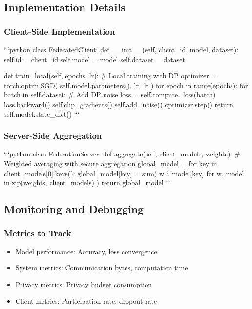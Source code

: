 \documentclass[journal]{IEEEtran}
\begin{document}
\subsection{Implementation Details}

\subsubsection{Client-Side Implementation}
```python
class FederatedClient:
    def __init__(self, client_id, model, dataset):
        self.id = client_id
        self.model = model
        self.dataset = dataset
        
    def train_local(self, epochs, lr):
        # Local training with DP
        optimizer = torch.optim.SGD(
            self.model.parameters(), lr=lr
        )
        for epoch in range(epochs):
            for batch in self.dataset:
                # Add DP noise
                loss = self.compute_loss(batch)
                loss.backward()
                self.clip_gradients()
                self.add_noise()
                optimizer.step()
        return self.model.state_dict()
```

\subsubsection{Server-Side Aggregation}
```python
class FederationServer:
    def aggregate(self, client_models, weights):
        # Weighted averaging with secure aggregation
        global_model = {}
        for key in client_models[0].keys():
            global_model[key] = sum(
                w * model[key] 
                for w, model in zip(weights, client_models)
            )
        return global_model
```

\subsection{Monitoring and Debugging}

\subsubsection{Metrics to Track}
\begin{itemize}
\item Model performance: Accuracy, loss convergence
\item System metrics: Communication bytes, computation time
\item Privacy metrics: Privacy budget consumption
\item Client metrics: Participation rate, dropout rate
\end{itemize}
\end{document}
